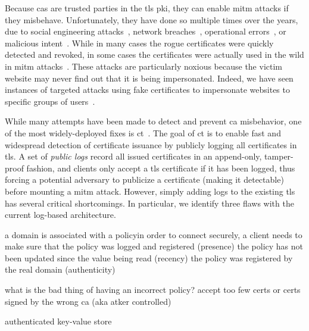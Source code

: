 Because \acp{ca} are trusted parties in the \ac{tls} \ac{pki}, they can enable
\ac{mitm} attacks if they misbehave. Unfortunately, they have done so multiple
times over the years, due to social engineering
attacks~\cite{microsoft2001erroneous}, network breaches~\cite{comodo2011fraud,
  hoogstraaten2012black}, operational errors~\cite{zusman2009sub,
  langley2013enhancing, somogyi2015improved, sleevi2015sustaining}, or malicious
  intent~\cite{percoco2012clarifying, langley2013further,
  langley2015maintaining}. While in many cases the rogue certificates were
  quickly detected and revoked, in some cases the certificates were actually
  used in the wild in \ac{mitm} attacks~\cite{nightingale2011diginotar}. These
  attacks are particularly noxious because the victim website may never find out
  that it is being impersonated. Indeed, we have seen instances of targeted
  attacks using fake certificates to impersonate websites to specific groups of
  users~\cite{eckersley2011syrian}.

While many attempts have been made to detect and prevent \ac{ca} misbehavior,
one of the most widely-deployed fixes is \ac{ct}~\cite{rfc6962}. The goal of
\ac{ct} is to enable fast and widespread detection of certificate issuance by
publicly logging all certificates in \ac{tls}. A set of \emph{public logs}
record all issued certificates in an append-only, tamper-proof fashion, and
clients only accept a \ac{tls} certificate if it has been logged, thus forcing a
potential adversary to publicize a certificate (making it detectable) before
mounting a \ac{mitm} attack. However, simply adding logs to the existing
\ac{tls} has several critical shortcomings. In particular, we identify three
flaws with the current log-based architecture.


a domain is associated with a policyin order to connect securely, a client needs
to make sure that
the policy was logged and registered (presence)
the policy has not been updated since the value being read (recency)
the policy was registered by the real domain (authenticity)

what is the bad thing of having an incorrect policy?
  accept too few certs or certs signed by the wrong ca (aka atker controlled)

authenticated key-value store

